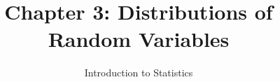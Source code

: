 \documentclass[slidestop,compress,mathserif]{beamer}
\title[Chp 3: Distributions of RVs]{Chapter 3: Distributions of Random Variables}
\author{Introduction to Statistics}
\date{}
\institute{}
\begin{document}


\begin{frame}[plain]

\titlepage

\end{frame}




%

%

\end{document}
